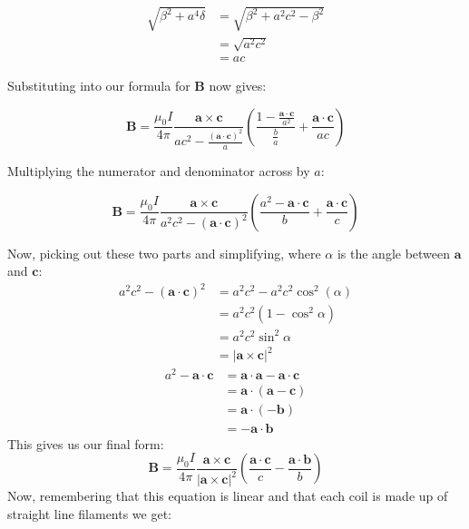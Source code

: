 \begin{align*}
  \sqrt{\beta^2 + a^4 \delta} &= \sqrt{\beta^2 + a^2c^2 - \beta^2} \\
                              &= \sqrt{a^2c^2} \\
                              &= ac
\end{align*}

Substituting into our formula for $\mathbf{B}$ now gives:

\begin{equation*}
  \mathbf{B} = \frac{\mu_0 I}{4\pi} \frac{\mathbf{a}\times \mathbf{c}}{ac^2 - \frac{\left(\mathbf{a} \cdot \mathbf{c}\right)^2}{a}} \left( \frac{1 - \frac{\mathbf{a}\cdot{\mathbf{c}}}{a^2}}{\frac{b}{a}} + \frac{\mathbf{a} \cdot \mathbf{c}}{ac} \right)
\end{equation*}

Multiplying the numerator and denominator across by $a$:

\begin{equation*}
\mathbf{B} = \frac{\mu_0 I}{4\pi} \frac{\mathbf{a}\times \mathbf{c}}{a^2c^2 - \left(\mathbf{a} \cdot \mathbf{c}\right)^2} \left( \frac{a^2 - \mathbf{a}\cdot\mathbf{c}}{b} + \frac{\mathbf{a} \cdot \mathbf{c}}{c} \right)
\end{equation*}

Now, picking out these two parts and simplifying, where $\alpha$ is the angle between $\mathbf{a}$ and $\mathbf{c}$:
\begin{align*}
  a^2c^2 - \left( \mathbf{a} \cdot \mathbf{c} \right)^2 &= a^2c^2 - a^2c^2\cos^2(\alpha) \\
                               &= a^2c^2(1 - \cos^2\alpha) \\
                               &= a^2c^2\sin^2\alpha \\
                               &= \left \vert \mathbf{a} \times \mathbf{c} \right \vert ^2
\end{align*}
\begin{align*}
  a^2 - \mathbf{a} \cdot \mathbf{c} &= \mathbf{a} \cdot \mathbf{a} - \mathbf{a} \cdot \mathbf{c} \\
                              &= \mathbf{a} \cdot \left(\mathbf{a} - \mathbf{c}\right) \\
                              &= \mathbf{a} \cdot (-\mathbf{b}) \\
                              &= - \mathbf{a} \cdot \mathbf{b}
\end{align*}
This gives us our final form:
\begin{equation}\label{eq:biot_savart_final}
  \mathbf{B} = \frac{\mu_0 I}{4\pi} \frac{\mathbf{a} \times \mathbf{c}}{\left \vert \mathbf{a} \times \mathbf{c} \right \vert^2 } \left( \frac{\mathbf{a} \cdot \mathbf{c}}{c} - \frac{\mathbf{a} \cdot \mathbf{b}}{b} \right)
\end{equation}
Now, remembering that this equation is linear and that each coil is made up of straight line filaments we get:

